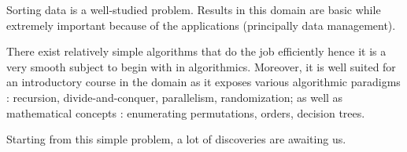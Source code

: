\label{tree:sorting:intro}

Sorting data is a well-studied problem. Results in this domain are basic while
extremely important because of the applications (principally data management).

There exist relatively simple algorithms that do the job efficiently hence it
is a very smooth subject to begin with in algorithmics. Moreover, it is well
suited for an introductory course in the domain as it exposes various
algorithmic paradigms : recursion, divide-and-conquer, parallelism,
randomization; as well as mathematical concepts : enumerating permutations,
orders, decision trees.

Starting from this simple problem, a lot of discoveries are awaiting us.
